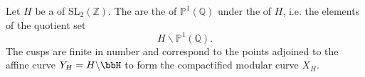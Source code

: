\begin{definition} \label{definition:cusps_of_classical_modular_curves}
Let $H$ be a  of $\mathrm{SL}_2(\mathbb{Z})$. The  are the  of $\mathbb{P}^1(\mathbb{Q})$ under the  of $H$, i.e. the elements of the quotient set
\[
    H \backslash \mathbb{P}^1(\mathbb{Q}).
\]
The cusps are finite in number and correspond to the points adjoined to the affine curve $Y_H = H \backslash \bbH$ to form the compactified modular curve $X_H$.
\end{definition}